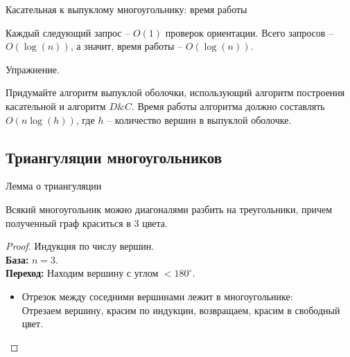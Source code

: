 \documentclass[12pt,aspectratio=169,svgnames]{beamer}
\begin{document}
    \begin{frame}{Касательная к выпуклому многоугольнику: время работы}

        Каждый следующий запрос -- $O(1)$ проверок ориентации.
        Всего запросов -- $O(\log(n))$, а значит, время работы -- $O(\log(n))$.
        
        \vspace{5mm}
        
        \begin{block}{Упражнение.}

            Придумайте алгоритм выпуклой оболочки, использующий алгоритм построения касательной и алгоритм
            $D\&C$. Время работы алгоритма должно составлять $O(n\log(h))$, где $h$ -- количество вершин  в выпуклой оболочке.

        \end{block}

    \end{frame}

    \subsection{Триангуляции многоугольников}

    \begin{frame}{Лемма о триангуляции}

    \vspace{2mm}
    \begin{lm}[О триангуляции]\hypertarget{trianglemm}{}

        Всякий многоугольник можно диагоналями разбить на треугольники, причем полученный граф краситься в 3 цвета.

    \end{lm}

    \begin{proof}\let\qed\relax
        Индукция по числу вершин.\\

        \textbf{База:} $n = 3$.\\
        \textbf{Переход:} Находим вершину с  углом $<180^{\circ}$.\\

        \begin{itemize}

            \item Отрезок между соседними  вершинами лежит в многоугольнике:\\
            Отрезаем вершину, красим по индукции, возвращаем, красим в свободный цвет.

        \end{itemize}

    \end{proof}

    \end{frame}
\end{document}
